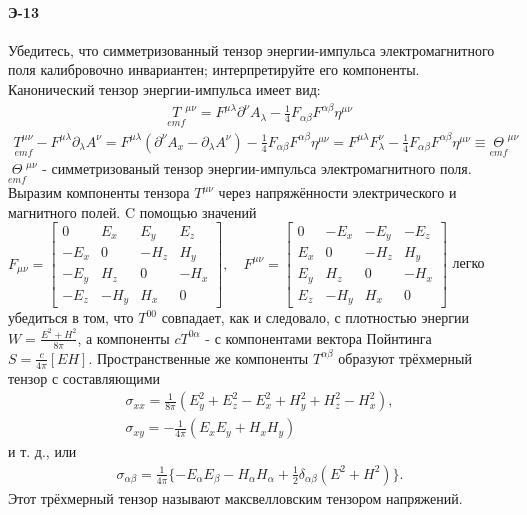 


\paragraph{Э-13}
Убедитесь, что симметризованный тензор энергии-импульса электромагнитного поля калибровочно инвариантен; интерпретируйте его компоненты.\\

Канонический тензор энергии-импульса имеет вид:
 \begin{gather*}
\underset{emf}{T}^{\mu\nu} = F^{\mu\lambda}\partial^\nu A_\lambda - \frac{1}{4}F_{\alpha\beta}F^{\alpha\beta}\eta^{\mu\nu}
\end{gather*}
\begin{gather*}
\underset{emf}{T^{\mu\nu}} - F^{\mu\lambda}\partial_\lambda A^\nu = F^{\mu\lambda}(\partial^\nu A_x - \partial_\lambda A^\nu) - \frac{1}{4}F_{\alpha\beta}F^{\alpha\beta}\eta^{\mu\nu} = F^{\mu\lambda}F^\nu_\lambda - \frac{1}{4}F_{\alpha\beta}F^{\alpha\beta}\eta^{\mu\nu}\equiv \underset{emf}{\Theta}^{\mu\nu}
\end{gather*}
 $\underset{emf}{\Theta}^{\mu\nu}$ - симметризованый тензор энергии-импульса электромагнитного поля.\\
Выразим компоненты тензора $T^{\mu\nu}$ через напряжённости электрического и магнитного полей. C помощью значений 
$F_{\mu\nu}= 
\begin{bmatrix}
	0 & E_x & E_y & E_z\\
-E_x & 0 & -H_z & H_y\\
-E_y & H_z & 0 & -H_x\\
-E_z & -H_y & H_x & 0
\end{bmatrix},
\quad F^{\mu\nu} = 
\begin{bmatrix}
0 & -E_x & -E_y & -E_z\\
E_x & 0 & -H_z & H_y\\
E_y & H_z & 0 & -H_x\\
E_z & -H_y & H_x & 0
\end{bmatrix}
$
легко убедиться в том, что $T^{00}$ совпадает, как и следовало, с плотностью энергии $W = \frac{E^2 + H^2}{8\pi}$, а компоненты $cT^{0\alpha}$ - с компонентами вектора Пойнтинга $S = \frac{c}{4\pi}[EH]$. Пространственные же компоненты $T^{\alpha\beta}$ образуют трёхмерный тензор с составляющими
\begin{gather*}
	\sigma_{xx} = \frac{1}{8\pi}(E^2_y + E^2_z - E^2_x + H^2_y + H^2_z - H^2_x),\\
	\sigma_{xy} = -\frac{1}{4\pi}(E_xE_y + H_xH_y)
\end{gather*}
и т. д., или
\begin{gather*}
	\sigma_{\alpha\beta} = \frac{1}{4\pi}\{-E_\alpha E_\beta - H_\alpha H_\alpha + \frac{1}{2}\delta_{\alpha\beta}(E^2 + H^2)\}.
\end{gather*}
 Этот трёхмерный тензор называют максвелловским тензором напряжений.
 
